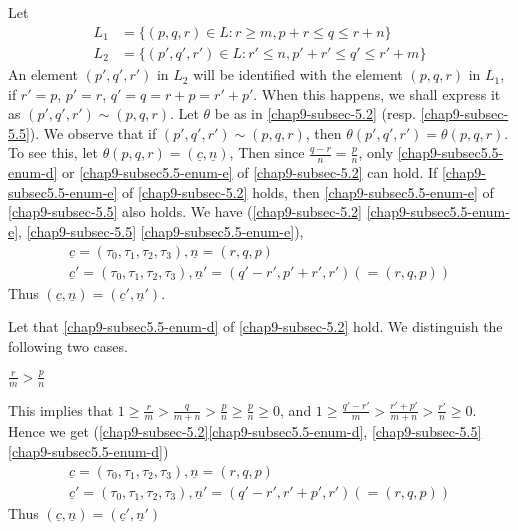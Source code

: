 \subsection{}\label{chap9-subsec-5.7}
Let
\begin{align*}
L_{1} &= \{(p,q,r) \in L : r \geq m ,p + r \leq q \leq r+ n\}\\
L_{2} &=\{(p',q',r') \in L : r' \leq n, p' + r' \leq q' \leq r' +m \}
\end{align*}
An element $(p',q',r')$ in $L_{2}$ will be identified with the element $(p,q,r)$ in $L_{1}$, if $r' =p$, $p'=r$, $q' = q =r +p =r' +p'$. When this happens, we shall express it as $(p',q',r')\sim(p,q,r)$. Let $\theta$ be as in
\ref{chap9-subsec-5.2} (resp. \ref{chap9-subsec-5.5}). We observe that if $(p',q',r')\sim (p,q,r)$, then $\theta(p',q', r')= \theta(p,q,r)$. To see this, let $\theta(p,q,r) = (\underline{c},\underline{n})$, Then since $\frac{q-r}{n} = \frac{p}{n}$, only \eqref{chap9-subsec5.5-enum-d} or \eqref{chap9-subsec5.5-enum-e} of \ref{chap9-subsec-5.2} can hold. If \eqref{chap9-subsec5.5-enum-e} of \ref{chap9-subsec-5.2} holds, then \eqref{chap9-subsec5.5-enum-e} of \ref{chap9-subsec-5.5} also holds. We have (\ref{chap9-subsec-5.2} \eqref{chap9-subsec5.5-enum-e}, \ref{chap9-subsec-5.5} \eqref{chap9-subsec5.5-enum-e}),
\begin{gather*}
\underline{c}= (\tau_{0}, \tau_{1}, \tau_{2}, \tau_{3}), \underline{n} = (r,q, p)\\
\underline{c}' = (\tau_{0}, \tau_{1}, \tau_{2}, \tau_{3}), \underline{n}' = (q'-r', p'+r',r')(=(r,q,p))
\end{gather*}
Thus $(\underline{c}, \underline{n}) = (\underline{c}', \underline{n}')$.

Let that \eqref{chap9-subsec5.5-enum-d} of \ref{chap9-subsec-5.2} hold. We distinguish the following two cases.

\setcounter{case}{0}
\begin{case}\label{chap9-5.7-case-1}
$\frac{r}{m} > \frac{p}{n}$

This implies that $1 \geq \frac{r}{m} > \frac{q}{m+n} > \frac{p}{n} \geq \frac{p}{n}\geq  0$, and $1 \geq \frac{q'-r'}{m} > \frac{r'+p'}{m+n} > \frac{r'}{n} \geq 0$.
Hence we get (\ref{chap9-subsec-5.2}\eqref{chap9-subsec5.5-enum-d}, \ref{chap9-subsec-5.5}\eqref{chap9-subsec5.5-enum-d})
\begin{gather*}
\underline{c} = (\tau_{0}, \tau_{1}, \tau_{2}, \tau_{3}), \underline{n}= (r, q, p)\\
\underline{c}' = (\tau_{0}, \tau_{1}, \tau_{2}, \tau_{3}), \underline{n}'= (q'-r',r'+p',r')(=(r,q, p))
\end{gather*}
Thus $(\underline{c}, \underline{n})=(\underline{c}', \underline{n}')$
\end{case}

